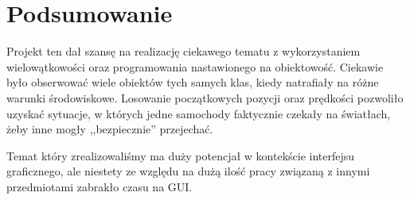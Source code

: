 \documentclass[a4paper]{article}
\begin{document}
\section{Podsumowanie}
Projekt ten dał szansę na realizację ciekawego tematu z wykorzystaniem wielowątkowości oraz programowania nastawionego na obiektowość. Ciekawie było obserwować wiele obiektów tych samych klas, kiedy natrafiały na różne warunki środowiskowe. Losowanie początkowych pozycji oraz prędkości pozwoliło uzyskać sytuacje, w których jedne samochody faktycznie czekały na światłach, żeby inne mogły ,,bezpiecznie'' przejechać.

Temat który zrealizowaliśmy ma duży potencjał w kontekście interfejsu graficznego, ale niestety ze względu na dużą ilość pracy związaną z innymi przedmiotami zabrakło czasu na GUI.
\end{document}
